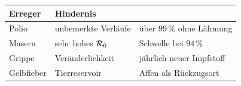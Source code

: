 \begin{geschichte}
\begin{center}
{\small
\renewcommand{\arraystretch}{1.45}
\begin{tabular}{@{}P{2.2cm}P{2.6cm}P{3.2cm}@{}}
\toprule
\textbf{Erreger} & \textbf{Hindernis} & \\
\midrule
Polio & unbemerkte Verläufe & über $99\,\%$ ohne Lähmung\\
Masern & sehr hohes $\mathcal{R}_0$ & Schwelle bei $94\,\%$\\
Grippe & Veränderlichkeit & jährlich neuer Impfstoff\\
Gelbfieber & Tierreservoir & Affen als Rückzugsort\\
\bottomrule
\end{tabular}}
\end{center}
\end{geschichte}

